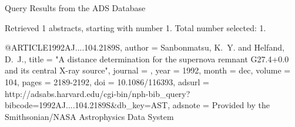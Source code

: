 Query Results from the ADS Database


Retrieved 1 abstracts, starting with number 1.  Total number selected: 1.

@ARTICLE{1992AJ....104.2189S,
   author = {{Sanbonmatsu}, K.~Y. and {Helfand}, D.~J.},
    title = "{A distance determination for the supernova remnant G27.4+0.0 and its central X-ray source}",
  journal = {\aj},
     year = 1992,
    month = dec,
   volume = 104,
    pages = {2189-2192},
      doi = {10.1086/116393},
   adsurl = {http://adsabs.harvard.edu/cgi-bin/nph-bib_query?bibcode=1992AJ....104.2189S&db_key=AST},
  adsnote = {Provided by the Smithsonian/NASA Astrophysics Data System}
}


